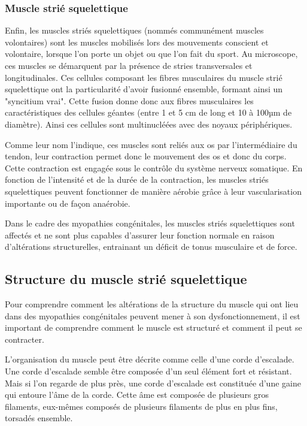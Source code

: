 \subsubsection{Muscle strié squelettique}
Enfin, les muscles striés squelettiques (nommés communément muscles volontaires) sont les muscles mobilisés lors des mouvements conscient et volontaire, lorsque l'on porte un objet ou que l'on fait du sport. Au microscope, ces muscles se démarquent par la présence de stries transversales et longitudinales. Ces cellules composant les fibres musculaires du muscle strié squelettique ont la particularité d'avoir fusionné ensemble, formant ainsi un "syncitium vrai". Cette fusion donne donc aux fibres musculaires les caractéristiques des cellules géantes (entre 1 et 5 cm de long et 10 à 100µm de diamètre). Ainsi ces cellules sont multinucléées avec des noyaux périphériques.

Comme leur nom l'indique, ces muscles sont reliés aux os par l'intermédiaire du tendon, leur contraction permet donc le mouvement des os et donc du corps. Cette contraction est engagée sous le contrôle du système nerveux somatique. En fonction de l'intensité et de la durée de la contraction, les muscles striés squelettiques peuvent fonctionner de manière aérobie grâce à leur vascularisation importante ou de façon anaérobie.

Dans le cadre des myopathies congénitales, les muscles striés squelettiques sont affectés et ne sont plus capables d'assurer leur fonction normale en raison d'altérations structurelles, entrainant un déficit de tonus musculaire et de force.

\subsection{Structure du muscle strié squelettique}
Pour comprendre comment les altérations de la structure du muscle qui ont lieu dans des myopathies congénitales peuvent mener à son dysfonctionnement, il est important de comprendre comment le muscle est structuré et comment il peut se contracter.

L'organisation du muscle peut être décrite comme celle d'une corde d'escalade. Une corde d'escalade semble être composée d'un seul élément fort et résistant. Mais si l'on regarde de plus près, une corde d'escalade est constituée d'une gaine qui entoure l'âme de la corde. Cette âme est composée de plusieurs gros filaments, eux-mêmes composés de plusieurs filaments de plus en plus fins, torsadés ensemble. 

